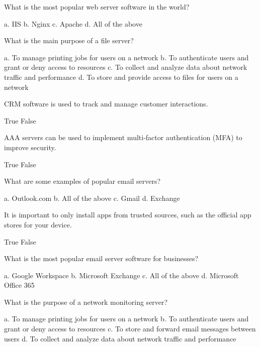 \documentclass{exam}
\begin{document}
\begin{questions}
\question What is the most popular web server software in the world?
\begin{checkboxes}
\choice a. IIS
\choice b. Nginx
\choice c. Apache
\CorrectChoice d. All of the above
\end{checkboxes}

\question What is the main purpose of a file server?
\begin{checkboxes}
\choice a. To manage printing jobs for users on a network
\choice b. To authenticate users and grant or deny access to resources
\choice c. To collect and analyze data about network traffic and performance
\CorrectChoice d. To store and provide access to files for users on a network
\end{checkboxes}

\question CRM software is used to track and manage customer interactions.
\begin{checkboxes}
\CorrectChoice True
\choice False
\end{checkboxes}

\question AAA servers can be used to implement multi-factor authentication (MFA) to improve security.
\begin{checkboxes}
\CorrectChoice True
\choice False
\end{checkboxes}

\question What are some examples of popular email servers?
\begin{checkboxes}
\choice a. Outlook.com
\CorrectChoice b. All of the above
\choice c. Gmail
\choice d. Exchange
\end{checkboxes}

\question It is important to only install apps from trusted sources, such as the official app stores for your device.
\begin{checkboxes}
\CorrectChoice True
\choice False
\end{checkboxes}

\question What is the most popular email server software for businesses?
\begin{checkboxes}
\choice a. Google Workspace
\choice b. Microsoft Exchange
\choice c. All of the above
\CorrectChoice d. Microsoft Office 365
\end{checkboxes}

\question What is the purpose of a network monitoring server?
\begin{checkboxes}
\choice a. To manage printing jobs for users on a network
\choice b. To authenticate users and grant or deny access to resources
\choice c. To store and forward email messages between users
\CorrectChoice d. To collect and analyze data about network traffic and performance
\end{checkboxes}


\end{questions}
\end{document}
